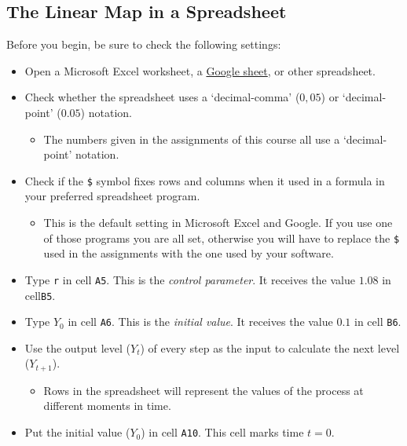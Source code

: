 \documentclass[]{book}
\providecommand{\tightlist}{%
  \setlength{\itemsep}{0pt}\setlength{\parskip}{0pt}}
\begin{document}
\subsection{The Linear Map in a
Spreadsheet}\label{the-linear-map-in-a-spreadsheet}

Before you begin, be sure to check the following settings:

\begin{itemize}
\tightlist
\item
  Open a Microsoft Excel worksheet, a
  \href{https://www.google.com/docs/about/}{Google sheet}, or other
  spreadsheet.
\item
  Check whether the spreadsheet uses a `decimal-comma' (\(0,05\)) or
  `decimal-point' (\(0.05\)) notation.

  \begin{itemize}
  \tightlist
  \item
    The numbers given in the assignments of this course all use a
    `decimal-point' notation.
  \end{itemize}
\item
  Check if the \texttt{\$} symbol fixes rows and columns when it used in
  a formula in your preferred spreadsheet program.

  \begin{itemize}
  \tightlist
  \item
    This is the default setting in Microsoft Excel and Google. If you
    use one of those programs you are all set, otherwise you will have
    to replace the \texttt{\$} used in the assignments with the one used
    by your software.
  \end{itemize}
\item
  Type \texttt{r} in cell \texttt{A5}. This is the \emph{control
  parameter}. It receives the value \(1.08\) in cell\texttt{B5}.
\item
  Type \(Y_0\) in cell \texttt{A6}. This is the \emph{initial value}. It
  receives the value \(0.1\) in cell \texttt{B6}.\\
\item
  Use the output level (\(Y_t\)) of every step as the input to calculate
  the next level (\(Y_{t+1}\)).

  \begin{itemize}
  \tightlist
  \item
    Rows in the spreadsheet will represent the values of the process at
    different moments in time.
  \end{itemize}
\item
  Put the initial value (\(Y_0\)) in cell \texttt{A10}. This cell marks
  time \(t=0\).


\end{itemize}
\end{document}
